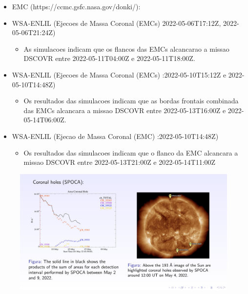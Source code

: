 \documentclass[a4paper, 10pt]{article}
\begin{document}
\begin{itemize} 
 \item EMC (https://ccmc.gsfc.nasa.gov/donki/):
\item WSA-ENLIL (Ejecoes de Massa Coronal (EMCs) 2022-05-06T17:12Z, 2022-05-06T21:24Z)
\begin{itemize} 
 \item As simulacoes indicam que os flancos das EMCs alcancarao a missao DSCOVR entre 2022-05-11T04:00Z e 2022-05-11T18:00Z.
\end{itemize} 
 \item WSA-ENLIL (Ejecoes de Massa Coronal (EMCs) :2022-05-10T15:12Z e 2022-05-10T14:48Z)
\begin{itemize} 
 \item Os resultados das simulacoes indicam que as bordas frontais combinada das EMCs alcancara a missao DSCOVR entre 2022-05-13T16:00Z e 2022-05-14T06:00Z.
\end{itemize} 
 \item WSA-ENLIL (Ejecao de Massa Coronal (EMC) :2022-05-10T14:48Z)
\begin{itemize} 
 \item Os resultados das simulacoes indicam que o flanco da EMC alcancara a missao DSCOVR entre 2022-05-13T21:00Z e 2022-05-14T11:00Z 
\end{itemize} 
 \end{itemize} 
 

    \begin{figure}[H]
        \centering
        \includegraphics[width=14cm]{./figures/pt_outfileSun_0.jpg}
    \end{figure} 
 
\end{document}
